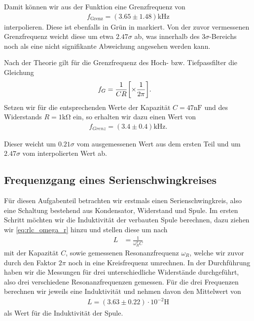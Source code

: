 Damit können wir aus der Funktion eine Grenzfrequenz von
\begin{align}
  f_{\mathrm{Grenz}} = (3.65 \pm 1.48) \si{\kilo\hertz}
\end{align}
interpolieren. Diese ist ebenfalls in Grün in  markiert. Von der zuvor vermessenen Grenzfrequenz weicht diese um etwa $2.47\sigma$ ab, was innerhalb des $3\sigma$-Bereichs noch als eine nicht signifikante Abweichung angesehen werden kann.

Nach der Theorie gilt für die Grenzfrequenz des Hoch- bzw. Tiefpassfilter die Gleichung
\begin{align}
  f_G &= \frac{1}{CR} \qty[\times \frac{1}{2 \pi}].
\end{align}
Setzen wir für die entsprechenden Werte der Kapazität $C = 47\si{\nano\farad}$ und des Widerstands $R = 1\si{\kilo\ohm}$ ein, so erhalten wir dazu einen Wert von
\begin{align}
  f_{Grenz} = (3.4 \pm 0.4)\si{\kilo\hertz}.
\end{align}

Dieser weicht um $0.21\sigma$ vom ausgemessenen Wert aus dem ersten Teil und um $2.47\sigma$ vom interpolierten Wert ab.

\subsection{Frequenzgang eines Serienschwingkreises}

Für diesen Aufgabenteil betrachten wir erstmals einen Serienschwingkreis, also eine Schaltung bestehend aus Kondensator, Widerstand und Spule. Im ersten Schritt möchten wir die Induktivität der verbauten Spule berechnen, dazu ziehen wir \eqref{eq:rlc_omega_r} hinzu und stellen diese um nach
\begin{align}
  L &= \frac{1}{\omega_R^2 C}
\end{align}
mit der Kapazität $C$, sowie gemessenen Resonanzfrequenz $\omega_R$, welche wir zuvor durch den Faktor $2\pi$ noch in eine Kreisfrequenz umrechnen. In der Durchführung haben wir die Messungen für drei unterschiedliche Widerstände durchgeführt, also drei verschiedene Resonanzfrequenzen gemessen. Für die drei Frequenzen berechnen wir jeweils eine Induktivität und nehmen davon den Mittelwert von
\begin{align}
  L = (3.63 \pm 0.22) \cdot 10^{-2} \si{\henry}
\end{align}
als Wert für die Induktivität der Spule.

